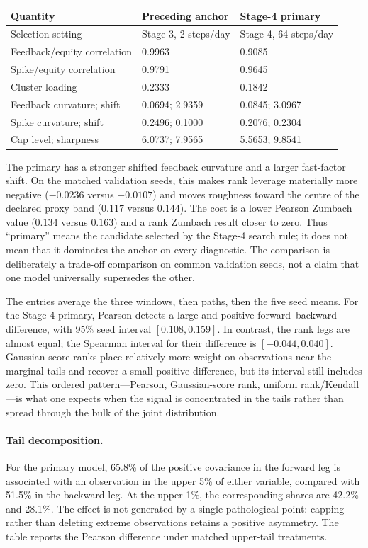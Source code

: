 \documentclass[11pt,a4paper]{article}
\begin{document}
\begin{center}
\begin{tabularx}{0.92\textwidth}{@{}Y C{29mm} C{29mm}@{}}
\toprule
\textbf{Quantity} & \textbf{Preceding anchor} & \textbf{Stage-4 primary} \\
\midrule
Selection setting & Stage-3, 2 steps/day & Stage-4, 64 steps/day \\
Feedback/equity correlation & 0.9963 & 0.9085 \\
Spike/equity correlation & 0.9791 & 0.9645 \\
Cluster loading & 0.2333 & 0.1842 \\
Feedback curvature; shift & 0.0694; 2.9359 & 0.0845; 3.0967 \\
Spike curvature; shift & 0.2496; 0.1000 & 0.2076; 0.2304 \\
Cap level; sharpness & 6.0737; 7.9565 & 5.5653; 9.8541 \\
\bottomrule
\end{tabularx}
\end{center}

The primary has a stronger shifted feedback curvature and a larger fast-factor shift. On the
matched validation seeds, this makes rank leverage materially more negative
(\(-0.0236\) versus \(-0.0107\)) and moves roughness toward the centre of the declared proxy
band (\(0.117\) versus \(0.144\)). The cost is a lower Pearson Zumbach value
(\(0.134\) versus \(0.163\)) and a rank Zumbach result closer to zero. Thus ``primary'' means
the candidate selected by the Stage-4 search rule; it does not mean that it dominates the anchor
on every diagnostic. The comparison is deliberately a trade-off comparison on common validation
seeds, not a claim that one model universally supersedes the other.

The entries average the three windows, then paths, then the five seed means. For the Stage-4
primary, Pearson detects a large and positive forward--backward difference, with 95\% seed
interval \([0.108,0.159]\). In contrast, the rank legs are almost equal; the Spearman interval
for their difference is \([-0.044,0.040]\). Gaussian-score ranks place relatively more weight
on observations near the marginal tails and recover a small positive difference, but its
interval still includes zero. This ordered pattern---Pearson, Gaussian-score rank, uniform
rank/Kendall---is what one expects when the signal is concentrated in the tails rather than
spread through the bulk of the joint distribution.

\paragraph{Tail decomposition.}
For the primary model, 65.8\% of the positive covariance in the forward leg is associated with
an observation in the upper 5\% of either variable, compared with 51.5\% in the backward leg.
At the upper 1\%, the corresponding shares are 42.2\% and 28.1\%. The effect is not generated
by a single pathological point: capping rather than deleting extreme observations retains a
positive asymmetry. The table reports the Pearson difference under matched upper-tail
treatments.
\end{document}
